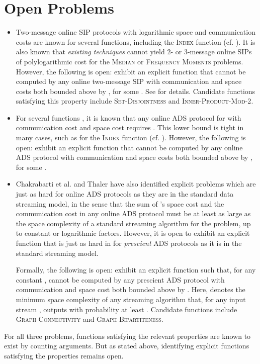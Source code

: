 \documentclass[11pt, letterpaper]{article}
\begin{document}
\section{Open Problems}
\begin{itemize}
\item Two-message online SIP protocols with logarithmic space and communication costs are known for several functions, including the \textsc{Index} function (cf. \cite{suresh}). It is also known that \emph{existing techniques} cannot yield 2- or 3-message online SIPs of polylogarithmic cost for the \textsc{Median} or \textsc{Frequency Moments} problems.
However, the following is open: exhibit an explicit function  that cannot be computed by any online two-message SIP with communication and space costs
both bounded above by , for some . See \cite{suresh} for details.
Candidate functions satisfying this property include \textsc{Set-Disjointness} and \textsc{Inner-Product-Mod-2}.
\item For several functions , it is known that
any online ADS protocol for  with communication
cost  and space cost  requires . This lower bound is tight
in many cases, such as for the \textsc{Index} function (cf. \cite{icalp}). However,
the following is open: exhibit an explicit function that cannot be computed by any online ADS protocol with communication and space costs
 both bounded above by , for some . 
\item Chakrabarti et al. \cite{soda} and Thaler \cite{semistreaming} have also identified explicit problems which are just as hard for online ADS protocols as they are in the standard data streaming model, in the sense that the sum of 's space cost and the communication cost in any online ADS protocol must be at least as large as the space complexity of a standard streaming algorithm for the problem, up to constant or logarithmic factors. However, it is open to exhibit an explicit function  that is just as hard in for \emph{prescient} ADS protocols as it is in the standard streaming model. 
 
 Formally, the following is open: exhibit an explicit function  such that, for any constant ,  cannot be computed by any prescient ADS protocol with communication and space cost both bounded above by . Here,  denotes the minimum space complexity of any streaming algorithm that, for any input stream , outputs  with probability at least . Candidate functions include \textsc{Graph Connectivity} and \textsc{Graph Bipartiteness}. 
\end{itemize}

For all three problems, functions satisfying the relevant properties are known to exist by counting arguments. But as stated above, identifying explicit functions satisfying the properties remains open.














 
 
\end{document}
